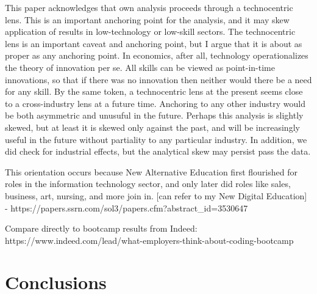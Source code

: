 \documentclass[review]{elsarticle}
\begin{document}

This paper acknowledges that own analysis proceeds through a technocentric lens.
This is an important anchoring point for the analysis, and it may skew application of results in low-technology or low-skill sectors.
The technocentric lens is an important caveat and anchoring point, but I argue that it is about as proper as any anchoring point.
In economics, after all, technology operationalizes the theory of innovation per se.
All skills can be viewed as point-in-time innovations, so that if there was no innovation then neither would there be a need for any skill.
By the same token, a technocentric lens at the present seems close to a cross-industry lens at a future time.
Anchoring to any other industry would be both asymmetric and unusuful in the future.
Perhaps this analysis is slightly skewed, but at least it is skewed only against the past, and will be increasingly useful in the future without partiality to any particular industry.
In addition, we did check for industrial effects, but the analytical skew may persist pass the data.

This orientation occurs because New Alternative Education first flourished for roles in the information technology sector, and only later did roles like sales, business, art, nursing, and more join in.
    [can refer to my New Digital Education] - https://papers.ssrn.com/sol3/papers.cfm?abstract_id=3530647

Compare directly to bootcamp results from Indeed: https://www.indeed.com/lead/what-employers-think-about-coding-bootcamp


\section{Conclusions}

\end{document}

